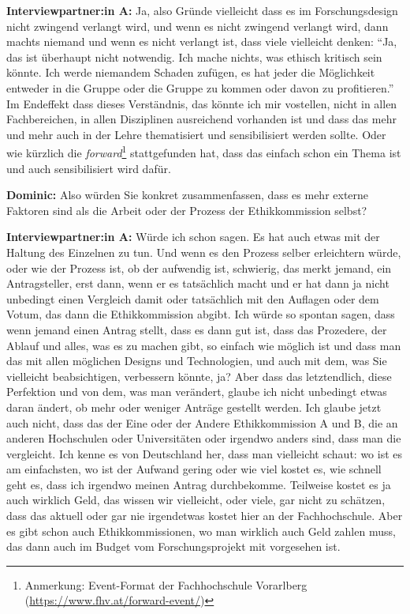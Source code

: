 \documentclass[a4paper,12pt,twoside]{scrreprt}
\begin{document}
\textbf{Interviewpartner:in A:} Ja, also Gründe vielleicht dass es im Forschungsdesign nicht zwingend verlangt wird, und wenn es nicht zwingend verlangt wird, dann machts niemand und wenn es nicht verlangt ist, dass viele vielleicht denken: \enquote{Ja, das ist überhaupt nicht notwendig. Ich mache nichts, was ethisch kritisch sein könnte. Ich werde niemandem Schaden zufügen, es hat jeder die Möglichkeit entweder in die Gruppe oder die Gruppe zu kommen oder davon zu profitieren.} Im Endeffekt dass dieses Verständnis, das könnte ich mir vostellen, nicht in allen Fachbereichen, in allen Disziplinen ausreichend vorhanden ist und dass das mehr und mehr auch in der Lehre thematisiert und sensibilisiert werden sollte. Oder wie kürzlich die \textit{forward}\footnote{Anmerkung: Event-Format der Fachhochschule Vorarlberg (\url{https://www.fhv.at/forward-event/})} stattgefunden hat, dass das einfach schon ein Thema ist und auch sensibilisiert wird dafür.

\textbf{Dominic:} Also würden Sie konkret zusammenfassen, dass es mehr externe Faktoren sind als die Arbeit oder der Prozess der Ethikkommission selbst?

\textbf{Interviewpartner:in A:} Würde ich schon sagen. Es hat auch etwas mit der Haltung des Einzelnen zu tun. Und wenn es den Prozess selber erleichtern würde, oder wie der Prozess ist, ob der aufwendig ist, schwierig, das merkt jemand, ein Antragsteller, erst dann, wenn er es tatsächlich macht und er hat dann ja nicht unbedingt einen Vergleich damit oder tatsächlich mit den Auflagen oder dem Votum, das dann die Ethikkommission abgibt. Ich würde so spontan sagen, dass wenn jemand einen Antrag stellt, dass es dann gut ist, dass das Prozedere, der Ablauf und alles, was es zu machen gibt, so einfach wie möglich ist und dass man das mit allen möglichen Designs und Technologien, und auch mit dem, was Sie vielleicht beabsichtigen, verbessern könnte, ja? Aber dass das letztendlich, diese Perfektion und von dem, was man verändert, glaube ich nicht unbedingt etwas daran ändert, ob mehr oder weniger Anträge gestellt werden. Ich glaube jetzt auch nicht, dass das der Eine oder der Andere Ethikkommission A und B, die an anderen Hochschulen oder Universitäten oder irgendwo anders sind, dass man die vergleicht. Ich kenne es von Deutschland her, dass man vielleicht schaut: wo ist es am einfachsten, wo ist der Aufwand gering oder wie viel kostet es, wie schnell geht es, dass ich irgendwo meinen Antrag durchbekomme. Teilweise kostet es ja auch wirklich Geld, das wissen wir vielleicht, oder viele, gar nicht zu schätzen, dass das aktuell oder gar nie irgendetwas kostet hier an der Fachhochschule. Aber es gibt schon auch Ethikkommissionen, wo man wirklich auch Geld zahlen muss, das dann auch im Budget vom Forschungsprojekt mit vorgesehen ist.
\end{document}
